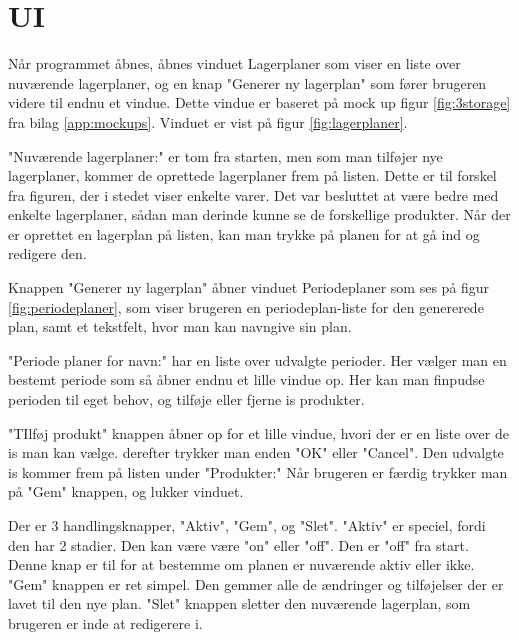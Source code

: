 \section{UI} 

Når programmet åbnes, åbnes vinduet Lagerplaner som viser en liste over nuværende lagerplaner, og en knap "Generer ny lagerplan" som fører brugeren videre til endnu et vindue. Dette vindue er baseret på mock up figur \ref{fig:3storage} fra bilag \ref{app:mockups}. Vinduet er vist på figur \ref{fig:lagerplaner}.

"Nuværende lagerplaner:" er tom fra starten, men som man tilføjer nye lagerplaner, kommer de oprettede lagerplaner frem på listen. Dette er til forskel fra figuren, der i stedet viser enkelte varer. Det var besluttet at være bedre med enkelte lagerplaner, sådan man derinde kunne se de forskellige produkter. 
Når der er oprettet en lagerplan på listen, kan man trykke på planen for at gå ind og redigere den. 

Knappen "Generer ny lagerplan" åbner vinduet Periodeplaner som ses på figur \ref{fig:periodeplaner}, som viser brugeren en periodeplan-liste for den genererede plan, samt et tekstfelt, hvor man kan navngive sin plan. 

"Periode planer for navn:" har en liste over udvalgte perioder. Her vælger man en bestemt periode som så åbner endnu et lille vindue op. Her kan man finpudse perioden til eget behov, og tilføje eller fjerne is produkter.   

"TIlføj produkt" knappen åbner op for et lille vindue, hvori der er en liste over de is man kan vælge. derefter trykker man enden "OK" eller "Cancel". Den udvalgte is kommer frem på listen under "Produkter:" Når brugeren er færdig trykker man på "Gem" knappen, og lukker vinduet.  

Der er 3 handlingsknapper, "Aktiv", "Gem", og "Slet". 
"Aktiv" er speciel, fordi den har 2 stadier. Den kan være være "on" eller "off". Den er "off" fra start. Denne knap er til for at bestemme om planen er nuværende aktiv eller ikke. "Gem" knappen er ret simpel. Den gemmer alle de ændringer og tilføjelser der er lavet til den nye plan. "Slet" knappen sletter den nuværende lagerplan, som brugeren er inde at redigerere i.

